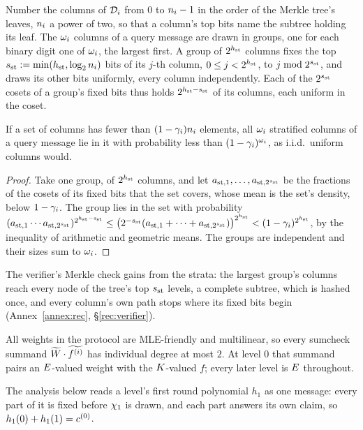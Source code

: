 \begin{definition}\label{def:strata}
Number the columns of $\mathcal{D}_i$ from $0$ to $n_i - 1$ in the order of the Merkle tree's leaves, $n_i$ a power of two, so that a column's top bits name the subtree holding its leaf. The $\omega_i$ columns of a query message are drawn in groups, one for each binary digit one of $\omega_i$, the largest first. A group of $2^{h_{\mathrm{st}}}$ columns fixes the top $s_{\mathrm{st}} := \min(h_{\mathrm{st}}, \log_2 n_i)$ bits of its $j$-th column, $0 \le j < 2^{h_{\mathrm{st}}}$, to $j \bmod 2^{s_{\mathrm{st}}}$, and draws its other bits uniformly, every column independently. Each of the $2^{s_{\mathrm{st}}}$ cosets of a group's fixed bits thus holds $2^{h_{\mathrm{st}} - s_{\mathrm{st}}}$ of its columns, each uniform in the coset.
\end{definition}

\begin{lemma}\label{lem:strata}
If a set of columns has fewer than $(1 - \gamma_i)n_i$ elements, all $\omega_i$ stratified columns of a query message lie in it with probability less than $(1 - \gamma_i)^{\omega_i}$, as i.i.d.\ uniform columns would.
\end{lemma}

\begin{proof}
Take one group, of $2^{h_{\mathrm{st}}}$ columns, and let $a_{\mathrm{st},1}, \dots, a_{\mathrm{st},2^{s_{\mathrm{st}}}}$ be the fractions of the cosets of its fixed bits that the set covers, whose mean is the set's density, below $1 - \gamma_i$. The group lies in the set with probability $(a_{\mathrm{st},1} \cdots a_{\mathrm{st},2^{s_{\mathrm{st}}}})^{2^{h_{\mathrm{st}} - s_{\mathrm{st}}}} \le \bigl(2^{-s_{\mathrm{st}}}(a_{\mathrm{st},1} + \dots + a_{\mathrm{st},2^{s_{\mathrm{st}}}})\bigr)^{2^{h_{\mathrm{st}}}} < (1 - \gamma_i)^{2^{h_{\mathrm{st}}}}$, by the inequality of arithmetic and geometric means. The groups are independent and their sizes sum to $\omega_i$.
\end{proof}

The verifier's Merkle check gains from the strata: the largest group's columns reach every node of the tree's top $s_{\mathrm{st}}$ levels, a complete subtree, which is hashed once, and every column's own path stops where its fixed bits begin (Annex~\ref{annex:rec}, \S\ref{rec:verifier}).

All weights in the protocol are MLE-friendly and multilinear, so every sumcheck summand $\widetilde{W} \cdot \widetilde{f^{(i)}}$ has individual degree at most $2$. At level $0$ that summand pairs an $E$-valued weight with the $K$-valued $f$; every later level is $E$ throughout.

The analysis below reads a level's first round polynomial $h_1$ as one message: every part of it is fixed before $\chi_1$ is drawn, and each part answers its own claim, so $h_1(0) + h_1(1) = c^{(0)}$.

